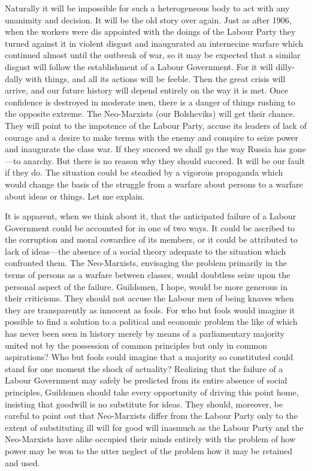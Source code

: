 \documentclass{book}
\begin{document}
Naturally it will be impossible for such a heterogeneous body to act with any unanimity and decision. It will be the old story over again. Just as after 1906, when the workers were dis appointed with the doings of the Labour Party they turned against it in violent disgust and inaugurated an internecine warfare which continued almost until the outbreak of war, so it may be expected that a similar disgust will follow the establishment of a Labour Government. For it will dilly-dally with things, and all its actions will be feeble. Then the great crisis will arrive, and our future history will depend entirely on the way it is met. Once confidence is destroyed in moderate men, there is a danger of things rushing to the opposite extreme. The Neo-Marxists (our Bolsheviks) will get their chance. They will point to the impotence of the Labour Party, accuse its leaders of lack of courage and a desire to make terms with the enemy and conspire to seize power and inaugurate the class war. If they succeed we shall go the way Russia has gone—to anarchy. But there is no reason why they should succeed. It will be our fault if they do. The situation could be steadied by a vigorous propaganda which would change the basis of the struggle from a warfare about persons to a warfare about ideas or things. Let me explain.

It is apparent, when we think about it, that the anticipated failure of a Labour Government could be accounted for in one of two ways. It could be ascribed to the corruption and moral cowardice of its members, or it could be attributed to lack of ideas—the absence of a social theory adequate to the situation which confronted them. The Neo-Marxists, envisaging the problem primarily in the terms of persons as a warfare between classes, would doubtless seize upon the personal aspect of the failure. Guildsmen, I hope, would be more generous in their criticisms. They should not accuse the Labour men of being knaves when they are transparently as innocent as fools. For who but fools would imagine it possible to find a solution to a political and economic problem the like of which has never been seen in history merely by means of a parliamentary majority united not by the possession of common principles but only in common aspirations? Who but fools could imagine that a majority so constituted could stand for one moment the shock of actuality? Realizing that the failure of a Labour Government may safely be predicted from its entire absence of social principles, Guildsmen should take every opportunity of driving this point home, insisting that goodwill is no substitute for ideas. They should, moreover, be careful to point out that Neo-Marxists differ from the Labour Party only to the extent of substituting ill will for good will inasmuch as the Labour Party and the Neo-Marxists have alike occupied their minds entirely with the problem of how power may be won to the utter neglect of the problem how it may be retained and used.
\end{document}
